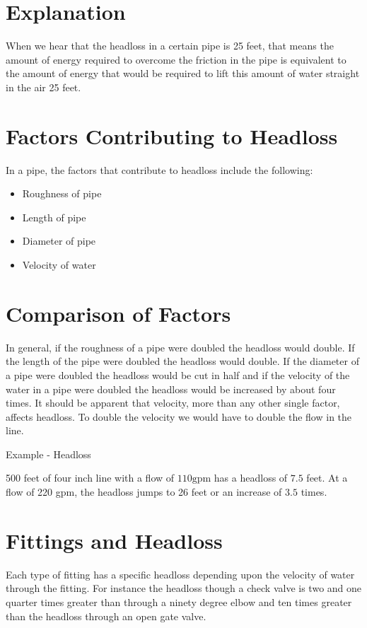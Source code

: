 \documentclass[10pt]{article}
\begin{document}
\section{Explanation}
When we hear that the headloss in a certain pipe is 25 feet, that means the amount of energy required to overcome the friction in the pipe is equivalent to the amount of energy that would be required to lift this amount of water straight in the air 25 feet.

\section{Factors Contributing to Headloss}
In a pipe, the factors that contribute to headloss include the following:

\begin{itemize}
  \item Roughness of pipe

  \item Length of pipe

  \item Diameter of pipe

  \item Velocity of water

\end{itemize}
\section{Comparison of Factors}
In general, if the roughness of a pipe were doubled the headloss would double. If the length of the pipe were doubled the headloss would double. If the diameter of a pipe were doubled the headloss would be cut in half and if the velocity of the water in a pipe were doubled the headloss would be increased by about four times. It should be apparent that velocity, more than any other single factor, affects headloss. To double the velocity we would have to double the flow in the line.

Example - Headloss

500 feet of four inch line with a flow of $110 \mathrm{gpm}$ has a headloss of $7.5$ feet. At a flow of 220 gpm, the headloss jumps to 26 feet or an increase of $3.5$ times.

\section{Fittings and Headloss}
Each type of fitting has a specific headloss depending upon the velocity of water through the fitting. For instance the headloss though a check valve is two and one quarter times greater than through a ninety degree elbow and ten times greater than the headloss through an open gate valve.
\end{document}
